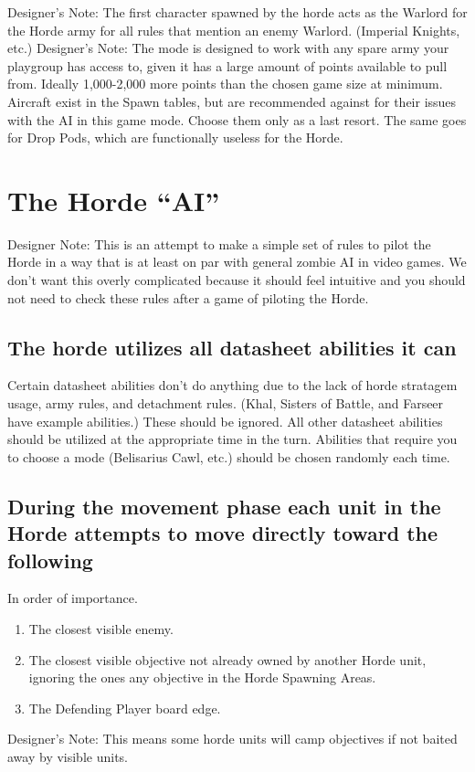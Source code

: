 \documentclass{HordeModeTarot}
\begin{document}
Designer’s Note: The first character spawned by the horde acts as the Warlord for the Horde army for all rules that mention an enemy Warlord. (Imperial Knights, etc.)
Designer’s Note: The mode is designed to work with any spare army your playgroup has access to, given it has a large amount of points available to pull from.  Ideally 1,000-2,000 more points than the chosen game size at minimum. Aircraft exist in the Spawn tables, but are recommended against for their issues with the AI in this game mode.  Choose them only as a last resort.  The same goes for Drop Pods, which are functionally useless for the Horde.

\section{The Horde “AI”}
Designer Note: This is an attempt to make a simple set of rules to pilot the Horde in a way that is at least on par with general zombie AI in video games.  We don’t want this overly complicated because it should feel intuitive and you should not need to check these rules after a game of piloting the Horde.

\subsection{The horde utilizes all datasheet abilities it can}
Certain datasheet abilities don’t do anything due to the lack of horde stratagem usage, army rules, and detachment rules. (Khal, Sisters of Battle, and Farseer have example abilities.)  These should be ignored.  All other datasheet abilities should be utilized at the appropriate time in the turn.  Abilities that require you to choose a mode (Belisarius Cawl, etc.) should be chosen randomly each time.


\subsection{During the movement phase each unit in the Horde attempts to move directly toward the following}
In order of importance.
\begin{enumerate}
\item The closest visible enemy. 
\item The closest visible objective not already owned by another Horde unit, ignoring the ones any objective in the Horde Spawning Areas.
\item The Defending Player board edge.
\end{enumerate}
Designer’s Note: This means some horde units will camp objectives if not baited away by visible units.
\end{document}
